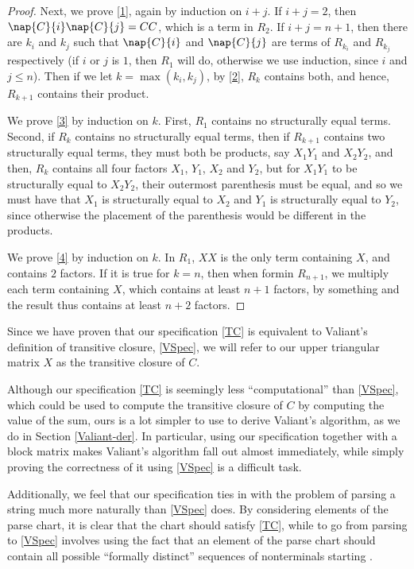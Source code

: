\begin{proof}
Next, we prove \ref{1}, again by induction on $i + j$. If $i + j = 2$, then $\nap{C}{i}\nap{C}{j} = CC$, which is a term in $R_2$. If $i + j = n + 1$, then there are $k_i$ and $k_j$ such that $\nap{C}{i}$ and $\nap{C}{j}$ are terms of $R_{k_i}$ and $R_{k_j}$ respectively (if $i$ or $j$ is $1$, then $R_1$ will do, otherwise we use induction, since $i$ and $j \le n$). Then if we let $k = \max(k_i,k_j)$, by \ref{2}, $R_k$ contains both, and hence, $R_{k+1}$ contains their product. 

We prove \ref{3} by induction on $k$. First, $R_1$ contains no structurally equal terms. Second, if $R_k$ contains no structurally equal terms, then if $R_{k+1}$ contains two structurally equal terms, they must both be products, say $X_1Y_1$ and $X_2Y_2$, and then, $R_{k}$ contains all four factors $X_1$, $Y_1$, $X_2$ and $Y_2$, but for $X_1Y_1$ to be structurally equal to $X_2Y_2$, their outermost parenthesis must be equal, and so we must have that $X_1$ is structurally equal to $X_2$ and $Y_1$ is structurally equal to $Y_2$, since otherwise the placement of the parenthesis would be different in the products. 

We prove \ref{4} by induction on $k$. In $R_1$, $XX$ is the only term containing $X$, and contains $2$ factors. If it is true for $k = n$, then when formin $R_{n+1}$, we multiply each term containing $X$, which contains at least $n + 1$ factors, by something and the result thus contains at least $n+2$ factors.
\end{proof}

Since we have proven that our specification \eqref{TC} is equivalent to Valiant's definition of transitive closure, \eqref{VSpec}, we will refer to our upper triangular matrix $X$ as the transitive closure of $C$. 

Although our specification \eqref{TC} is seemingly less ``computational'' than 
\eqref{VSpec}, which could be used to compute the transitive closure of $C$ by computing the value of the sum, ours is a lot simpler to use to derive Valiant's algorithm, as we do in Section \ref{Valiant-der}. In particular, using our specification together with a block matrix makes Valiant's algorithm fall out almost immediately, while simply proving the correctness of it using \eqref{VSpec} is a difficult task.

Additionally, we feel that our specification ties in with the problem of parsing a string much more naturally than \eqref{VSpec} does. By considering elements of the parse chart, it is clear that the chart should satisfy \eqref{TC}, while to go from parsing to \eqref{VSpec} involves using the fact that an element of the parse chart should contain all possible ``formally distinct'' sequences of nonterminals starting \cite{Valiant}.

